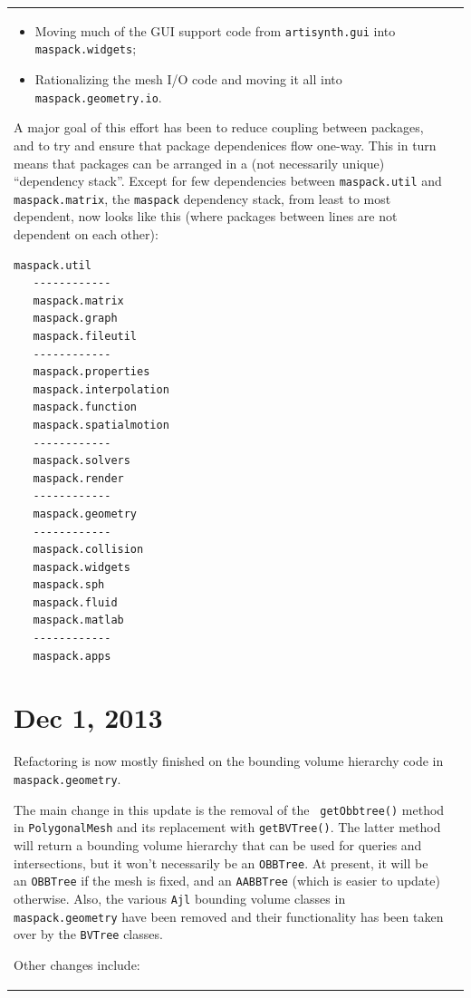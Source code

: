 \documentclass{article}
\begin{document}
\begin{tabular}{ll}
\begin{itemize}
\item Moving much of the GUI support code from {\tt artisynth.gui}
into {\tt maspack.widgets};

\item Rationalizing the mesh I/O code and moving it all
into {\tt maspack.geometry.io}.

\end{itemize}

A major goal of this effort has been to reduce coupling between
packages, and to try and ensure that package dependenices flow
one-way. This in turn means that packages can be arranged in a (not
necessarily unique) ``dependency stack''. Except for few dependencies
between {\tt maspack.util} and {\tt maspack.matrix}, the {\tt maspack}
dependency stack, from least to most dependent, now looks like this
(where packages between lines are not dependent on each other):

\begin{lstlisting}[]
   maspack.util
   ------------
   maspack.matrix
   maspack.graph
   maspack.fileutil
   ------------
   maspack.properties
   maspack.interpolation
   maspack.function
   maspack.spatialmotion
   ------------
   maspack.solvers
   maspack.render
   ------------
   maspack.geometry
   ------------
   maspack.collision
   maspack.widgets
   maspack.sph
   maspack.fluid
   maspack.matlab
   ------------
   maspack.apps
\end{lstlisting}

\section*{Dec 1, 2013}

Refactoring is now mostly finished on the bounding volume hierarchy
code in {\tt maspack.geometry}.

The main change in this update is the removal of the {\tt
getObbtree()} method in {\tt PolygonalMesh} and its replacement with
{\tt getBVTree()}. The latter method will return a bounding
volume hierarchy that can be used for queries and intersections, but
it won't necessarily be an {\tt OBBTree}. At present, it will be an
{\tt OBBTree} if the mesh is fixed, and an {\tt AABBTree} (which is
easier to update) otherwise. Also, the various {\tt Ajl} bounding
volume classes in {\tt maspack.geometry} have been removed
and their functionality has been taken over by the {\tt BVTree}
classes.

Other changes include:

\begin{itemize}


\end{itemize}
\end{tabular}
\end{document}
